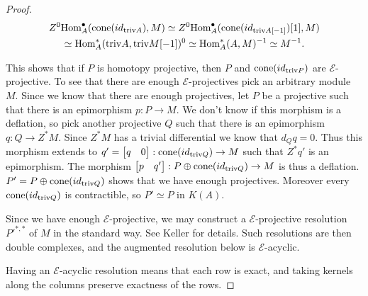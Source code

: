 \documentclass[../thesis.tex]{subfiles}
\begin{document}
\begin{proof}
                \begin{multline*}
                    Z^0\tt{Hom}_A^\bullet (\tt{cone}(id_{\tt{triv}A}), M) \simeq Z^0\tt{Hom}_A^\bullet (\tt{cone}(id_{\tt{triv}A[-1]})[1], M) \\ \simeq \tt{Hom}_A^*(\tt{triv}A, \tt{triv}M[-1])^0 \simeq \tt{Hom}_A^*(A, M)^{-1} \simeq M^{-1}\tt{.}
                \end{multline*}

                This shows that if $P$ is homotopy projective, then $P$ and $\tt{cone}(id_{\tt{triv}P})$ are $\mathcal{E}$-projective. To see that there are enough $\mathcal{E}$-projectives pick an arbitrary module $M$. Since we know that there are enough projectives, let $P$ be a projective such that there is an epimorphism $p : P \rightarrow M$. We don't know if this morphism is a deflation, so pick another projective $Q$ such that there is an epimorphism $q : Q \rightarrow Z^*M$. Since $Z^*M$ has a trivial differential we know that $d_Qq = 0$. Thus this morphism extends to $q' = \begin{bmatrix}
                    q & 0
                \end{bmatrix} : \tt{cone}(id_{\tt{triv}Q}) \rightarrow M$ such that $Z^*q'$ is an epimorphism. The morphism $\begin{bmatrix}
                    p & q'
                \end{bmatrix} : P \oplus \tt{cone}(id_{\tt{triv}Q}) \rightarrow M$ is thus a deflation. $P' = P \oplus \tt{cone}(id_{\tt{triv}Q})$ shows that we have enough projectives. Moreover every $\tt{cone}(id_{\tt{triv}Q})$ is contractible, so $P' \simeq P$ in $K(A)$.

                Since we have enough $\mathcal{E}$-projective, we may construct a $\mathcal{E}$-projective resolution $P'^{*,*}$ of $M$ in the standard way. See Keller \cite{Keller90} for details. Such resolutions are then double complexes, and the augmented resolution below is $\mathcal{E}$-acyclic.

                \begin{center}
                \end{center} 
                
                Having an $\mathcal{E}$-acyclic resolution means that each row is exact, and taking kernels along the columns preserve exactness of the rows.
                

\end{proof}
\end{document}
